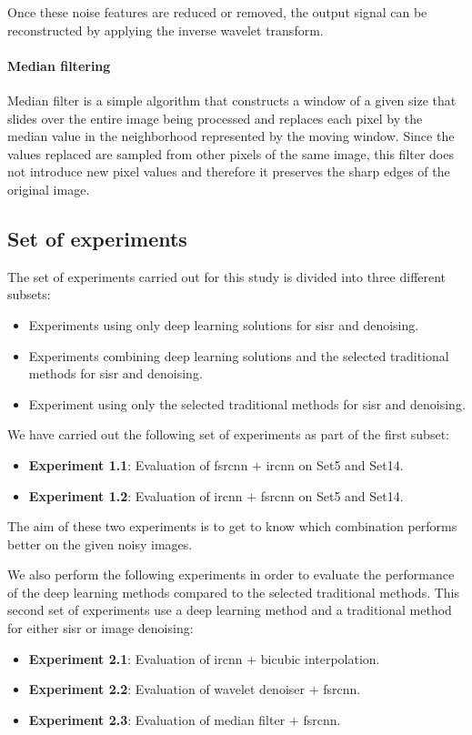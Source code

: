 Once these noise features are reduced or removed, the output signal can be reconstructed by applying the inverse wavelet transform.

\paragraph{Median filtering}
Median filter is a simple algorithm that constructs a window of a given size that slides over the entire image being processed and replaces each pixel by the median value in the neighborhood represented by the moving window. Since the values replaced are sampled from other pixels of the same image, this filter does not introduce new pixel values and therefore it preserves the sharp edges of the original image.

\subsection{Set of experiments}
The set of experiments carried out for this study is divided into three different subsets:
\begin{itemize}
	\item Experiments using only deep learning solutions for \gls{sisr} and denoising.
	\item Experiments combining deep learning solutions and the selected traditional methods for \gls{sisr} and denoising.
	\item Experiment using only the selected traditional methods for \gls{sisr} and denoising.
\end{itemize}

We have carried out the following set of experiments as part of the first subset:
\begin{itemize}
	\item \textbf{Experiment 1.1}: Evaluation of \gls{fsrcnn} $+$ \gls{ircnn} on Set5 and Set14.
	\item \textbf{Experiment 1.2}: Evaluation of \gls{ircnn} $+$ \gls{fsrcnn} on Set5 and Set14.
\end{itemize}

The aim of these two experiments is to get to know which combination performs better on the given noisy images.

We also perform the following experiments in order to evaluate the performance of the deep learning methods compared to the selected traditional methods. This second set of experiments use a deep learning method and a traditional method for either \gls{sisr} or image denoising:
\begin{itemize}
	\item \textbf{Experiment 2.1}: Evaluation of \gls{ircnn} $+$ bicubic interpolation.
	\item \textbf{Experiment 2.2}: Evaluation of wavelet denoiser $+$ \gls{fsrcnn}.
	\item \textbf{Experiment 2.3}: Evaluation of median filter $+$ \gls{fsrcnn}.
\end{itemize}

